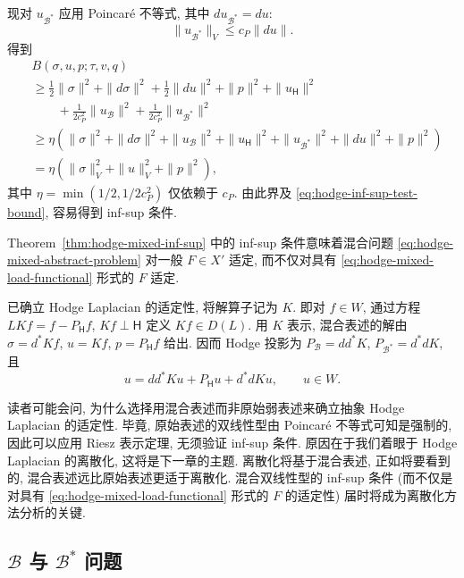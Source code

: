 \begin{Proof}
现对 $u_{\mathcal B^*}$ 应用 Poincaré 不等式, 其中 $du_{\mathcal B^*}=du$:
\[
\|u_{\mathcal B^*}\|_V\leq c_P\|du\|.
\]
得到
\[
\begin{aligned}
&B(\sigma,u,p;\tau,v,q)\\
&\geq\frac12\|\sigma\|^2+\|d\sigma\|^2+\frac12\|du\|^2+\|p\|^2+\|u_{\mathsf H}\|^2\\
&\qquad+\frac{1}{2c_P^2}\|u_{\mathcal B}\|^2+\frac{1}{2c_P^2}\|u_{\mathcal B^*}\|^2\\
&\geq\eta(\|\sigma\|^2+\|d\sigma\|^2+\|u_{\mathcal B}\|^2+\|u_{\mathsf H}\|^2+\|u_{\mathcal B^*}\|^2+\|du\|^2+\|p\|^2)\\
&=\eta(\|\sigma\|_V^2+\|u\|_V^2+\|p\|^2),
\end{aligned}
\]
其中 $\eta=\min(1/2,1/2c_P^2)$ 仅依赖于 $c_P$. 由此界及 \eqref{eq:hodge-inf-sup-test-bound}, 容易得到 inf-sup 条件.
\end{Proof}

\begin{Remark}\label{rem:hodge-general-mixed-load}
Theorem~\ref{thm:hodge-mixed-inf-sup} 中的 inf-sup 条件意味着混合问题 \eqref{eq:hodge-mixed-abstract-problem} 对一般 $F\in X'$ 适定, 而不仅对具有 \eqref{eq:hodge-mixed-load-functional} 形式的 $F$ 适定.
\end{Remark}

已确立 Hodge Laplacian 的适定性, 将解算子记为 $K$. 即对 $f\in W$, 通过方程 $LKf=f-P_{\mathsf H}f$, $Kf\perp\mathsf H$ 定义 $Kf\in D(L)$. 用 $K$ 表示, 混合表述的解由 $\sigma=d^*Kf$, $u=Kf$, $p=P_{\mathsf H}f$ 给出. 因而 Hodge 投影为 $P_{\mathcal B}=dd^*K$, $P_{\mathcal B^*}=d^*dK$, 且
\[
u=dd^*Ku+P_{\mathsf H}u+d^*dKu,\qquad u\in W.
\]

\begin{Remark}\label{rem:hodge-mixed-discretization-motivation}
读者可能会问, 为什么选择用混合表述而非原始弱表述来确立抽象 Hodge Laplacian 的适定性. 毕竟, 原始表述的双线性型由 Poincaré 不等式可知是强制的, 因此可以应用 Riesz 表示定理, 无须验证 inf-sup 条件. 原因在于我们着眼于 Hodge Laplacian 的离散化, 这将是下一章的主题. 离散化将基于混合表述, 正如将要看到的, 混合表述远比原始表述更适于离散化. 混合双线性型的 inf-sup 条件 (而不仅是对具有 \eqref{eq:hodge-mixed-load-functional} 形式的 $F$ 的适定性) 届时将成为离散化方法分析的关键.
\end{Remark}

\subsection{$\mathcal B$ 与 $\mathcal B^*$ 问题}\label{subsec:boundary-coboundary-problems}

